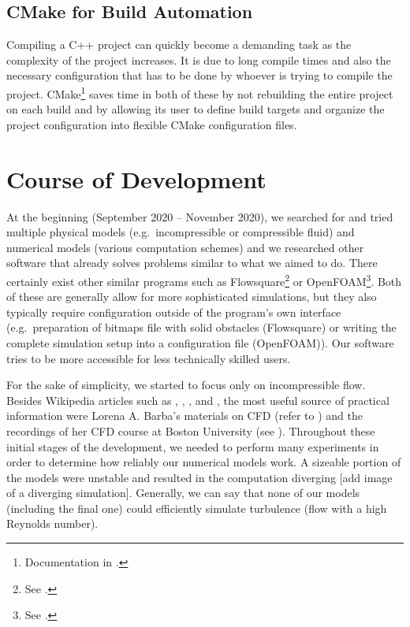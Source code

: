 \documentclass[11pt,a4paper,twoside,openright]{report}
\begin{document}
\subsection{CMake for Build Automation}
Compiling a C++ project can quickly become a demanding task as the complexity of the project increases. It is due to long compile times and also the necessary configuration that has to be done by whoever is trying to compile the project. CMake\footnote{Documentation in \cite{cmakedoc}.} saves time in both of these by not rebuilding the entire project on each build and by allowing its user to define build targets and organize the project configuration into flexible CMake configuration files.

\section{Course of Development}
At the beginning (September 2020 -- November 2020), we searched for and tried multiple physical models (e.g.\ incompressible or compressible fluid) and numerical models (various computation schemes) and we researched other software that already solves problems similar to what we aimed to do. There certainly exist other similar programs such as Flowsquare\footnote{See \cite{Flowsquare}.} or OpenFOAM\footnote{See \cite{OpenFOAM}.}. Both of these are generally allow for more sophisticated simulations, but they also typically require configuration outside of the program's own interface (e.g.\ preparation of bitmaps file with solid obstacles (Flowsquare) or writing the complete simulation setup into a configuration file (OpenFOAM)). Our software tries to be more accessible for less technically skilled users.

For the sake of simplicity, we started to focus only on incompressible flow. Besides Wikipedia articles such as \cite{WikiNavierStokes}, \cite{WikiJacobi}, \cite{WikiGaussSeidel}, and \cite{WikiSOR}, the most useful source of practical information were Lorena A. Barba's materials on CFD (refer to \cite{CFDpython}) and the recordings of her CFD course at Boston University (see \cite{BarbaCourse}). Throughout these initial stages of the development, we needed to perform many experiments in order to determine how reliably our numerical models work. A sizeable portion of the models were unstable and resulted in the computation diverging [add image of a diverging simulation]. Generally, we can say that none of our models (including the final one) could efficiently simulate turbulence (flow with a high Reynolds number).
\end{document}
